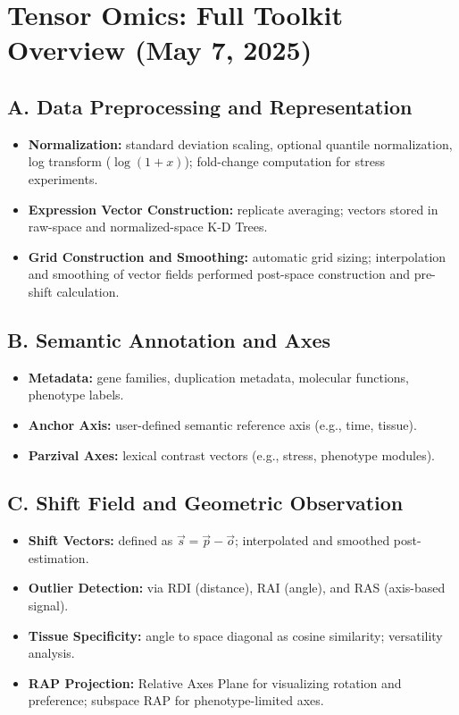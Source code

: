 \documentclass{article}
\begin{document}
\section*{Tensor Omics: Full Toolkit Overview (May 7, 2025)}

\subsection*{A. Data Preprocessing and Representation}
\begin{itemize}[leftmargin=1.5em]
  \item \textbf{Normalization:} standard deviation scaling, optional quantile normalization, log transform (\( \log(1 + x) \)); fold-change computation for stress experiments.
  \item \textbf{Expression Vector Construction:} replicate averaging; vectors stored in raw-space and normalized-space K-D Trees.
  \item \textbf{Grid Construction and Smoothing:} automatic grid sizing; interpolation and smoothing of vector fields performed post-space construction and pre-shift calculation.
\end{itemize}

\subsection*{B. Semantic Annotation and Axes}
\begin{itemize}[leftmargin=1.5em]
  \item \textbf{Metadata:} gene families, duplication metadata, molecular functions, phenotype labels.
  \item \textbf{Anchor Axis:} user-defined semantic reference axis (e.g., time, tissue).
  \item \textbf{Parzival Axes:} lexical contrast vectors (e.g., stress, phenotype modules).
\end{itemize}

\subsection*{C. Shift Field and Geometric Observation}
\begin{itemize}[leftmargin=1.5em]
  \item \textbf{Shift Vectors:} defined as \( \vec{s} = \vec{p} - \vec{o} \); interpolated and smoothed post-estimation.
  \item \textbf{Outlier Detection:} via RDI (distance), RAI (angle), and RAS (axis-based signal).
  \item \textbf{Tissue Specificity:} angle to space diagonal as cosine similarity; versatility analysis.
  \item \textbf{RAP Projection:} Relative Axes Plane for visualizing rotation and preference; subspace RAP for phenotype-limited axes.
\end{itemize}
\end{document}
